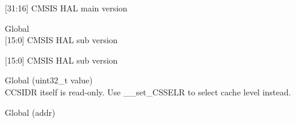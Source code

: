 \begin{DoxyRefList}
\label{deprecated__deprecated001335}%
%
\mbox{[}31\+:16\mbox{]} CMSIS HAL main version  
\item[Global \doxylink{_core_2_include_2core__sc300_8h_a664c9e59952455ddeee28173b864fe9d}{\+\_\+\+\_\+\+SC300\+\_\+\+CMSIS\+\_\+\+VERSION\+\_\+\+SUB} ]\hfill \\
\label{deprecated__deprecated000658}%
%
\mbox{[}15\+:0\mbox{]} CMSIS HAL sub version 

\label{deprecated__deprecated001336}%
%
\mbox{[}15\+:0\mbox{]} CMSIS HAL sub version  
\item[Global \doxylink{cmsis__cp15_8h_a639d467f42fdad7a173f90568b697fc8}{\+\_\+\+\_\+set\+\_\+\+CCSIDR} (uint32\+\_\+t value)]\hfill \\
\label{deprecated__deprecated000660}%
%
CCSIDR itself is read-\/only. Use \+\_\+\+\_\+set\+\_\+\+CSSELR to select cache level instead.  
\item[Global \doxylink{arm__math__memory_8h_a9de2e0a5785be82866bcb96012282248}{\+\_\+\+\_\+\+SIMD32} (addr)]\hfill \\
\label{deprecated__deprecated000662}%
%
  

\end{DoxyRefList}
